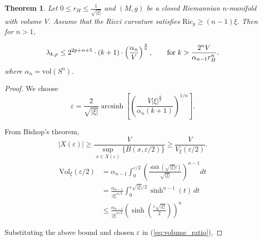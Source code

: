 \documentclass[10 pt, reqno]{amsart}
\newtheorem{theorem}{Theorem}[section]
\begin{document}
\begin{theorem}
\label{thm:volume}
 Let $0\le r_H\le \frac{1}{\sqrt{|\xi|}}$ and $(M,g)$ be a closed Riemannian $n$-manifold with volume $V$. Assume that the Ricci curvature satisfies $\mathrm{Ric}_g \ge (n-1)\xi .$ Then   for $n>1$,

\[
\lambda_{k,p}
\le
2^{2p+n+5}\cdot (k+1)\cdot \left(\frac{\alpha_n}{V}\right)^\frac{2}{n},\qquad \mathrm{for }\hspace{1mm} k>\frac{2^nV}{\alpha_{n-1}r_H^n}.
\]
where $\alpha_n=\mathrm{vol}(S^n).$
\end{theorem}
\begin{proof}
We choose \[\varepsilon
=
\frac{2}{\sqrt{|\xi|}}\operatorname{arcsinh}\left[\left(\frac{ V|\xi|^\frac{n}{2}}{\alpha_n(k+1)}\right)^{1/n}\right].
\]  

From Bishop's theorem, 
\begin{equation}
\label{eq:volume_ratio}
  |X(\varepsilon)|\ge \frac{V}{\sup_{x\in X(\varepsilon)}\{B(x,\varepsilon/2)\}}\ge \frac{V}{V_{\xi}(\varepsilon/2)}.  
\end{equation}
\begin{align}
\mathrm{Vol}_{\xi}(\varepsilon/2)
&=
\alpha_{n-1}
\int_{0}^{\varepsilon/2}
\left(
\frac{\sinh(\sqrt{|\xi|}t)}{\sqrt{|\xi|}}
\right)^{n-1}
dt \nonumber\\
&=
\frac{\alpha_{n-1}}{|\xi|^{n/2}}
\int_0^{\varepsilon \sqrt{|\xi|}/2}
\sinh^{n-1}(t)\,dt \nonumber\\
&\le
\frac{\alpha_{n-1}}{|\xi|^{n/2}}
\left(
\sinh\left(\frac{\varepsilon \sqrt{|\xi|}}{2}\right)
\right)^n \nonumber
\end{align}

Substituting the above bound and chosen $\varepsilon$ in (\ref{eq:volume_ratio}),


\end{proof}
\end{document}
